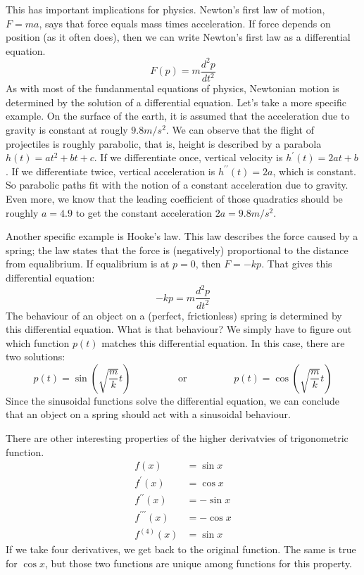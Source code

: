 \documentclass[fleqn]{report}
\begin{document}
This has important implications for physics. Newton's first
law of motion, $F = ma$, says that  force equals mass times
acceleration. If force depends on position (as it often does),
then we can write Newton's first law as a differential
equation.
\begin{equation*}
F(p) = m \frac{d^2 p}{dt^2}
\end{equation*}
As with most of the fundanmental equations of physics,
Newtonian motion is determined by the solution of a
differential equation. Let's take a more specific example.
On the surface of the earth, it is assumed that the
acceleration due to gravity is constant at rougly $9.8 m/s^2$.
We can observe that the flight of projectiles is roughly
parabolic, that is, height is described by a parabola $h(t) =
at^2 + bt + c$. If we differentiate once, vertical velocity
is $h^\prime(t) = 2at + b$. If we differentiate twice,
vertical acceleration is $h^{\prime \prime}(t) = 2a$, which is
constant. So parabolic paths fit with the notion of a
constant acceleration due to gravity. Even more, we know that
the leading coefficient of those quadratics should be roughly
$a = 4.9$ to get the constant acceleration $2a = 9.8m/s^2$. 

Another specific example is Hooke's law. This
law describes the force caused by a spring; the law states that
the force is (negatively) proportional to the distance from
equalibrium. If equalibrium is at $p=0$, then $F = -kp$.
That gives this differential equation:
\begin{equation*}
-kp = m \frac{d^2 p}{dt^2}
\end{equation*}
The behaviour of an object on a (perfect,
frictionless) spring is determined by this differential
equation. What is that behaviour? We simply have to figure
out which function $p(t)$ matches this differential equation.
In this case, there are two solutions: 
\begin{equation*}
p(t) = \sin \left( \sqrt{\frac{m}{k}} t \right) \hspace{2cm}
\text{or} \hspace{2cm} 
p(t) = \cos \left( \sqrt{\frac{m}{k}} t \right) 
\end{equation*}
Since the sinusoidal functions solve the differential
equation, we can conclude that an object on a spring should
act with a sinusoidal behaviour.

\begin{example}
There are other interesting properties of the higher
derivatvies of trigonometric function. 
\begin{align*}
f(x) & = \sin x \\
f^\prime(x) & = \cos x \\
f^{\prime\prime}(x) & = -\sin x \\
f^{\prime\prime\prime}(x) & = -\cos x \\
f^{(4)}(x) & = \sin x
\end{align*}
If we take four derivatives, we get back to the original
function. The same is true for $\cos x$, but those two
functions are unique among functions for this
property. 
\end{example}
\end{document}
